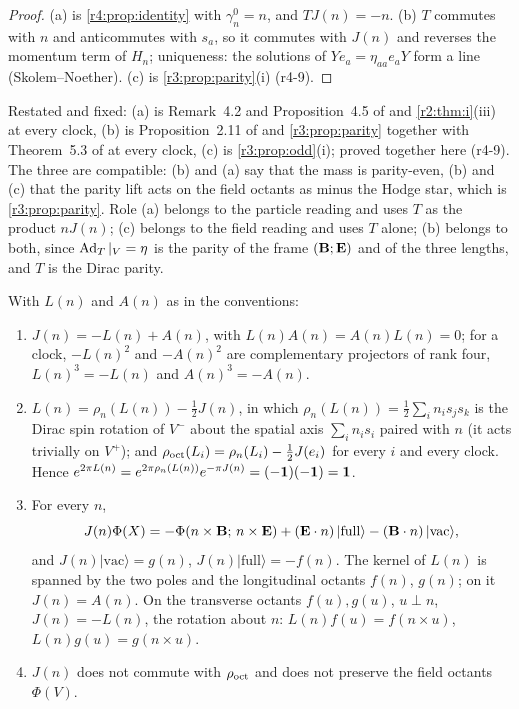 \begin{proof}
(a) is \cref{r4:prop:identity} with $\gamma^0_n=n$, and $TJ(n)=-n$. (b) $T$ commutes with $n$ and anticommutes with $s_a$, so it commutes with $J(n)$ and
reverses the momentum term of $H_n$; uniqueness: the solutions of $Ye_a=\eta_{aa}e_aY$ form a line (Skolem--Noether). (c) is
\cref{r3:prop:parity}(i) (r4-9).
\end{proof}

Restated and fixed: (a) is Remark~4.2 and Proposition~4.5 of \cite{ES17} and \cref{r2:thm:i}(iii) at every clock, (b) is Proposition~2.11 of \cite{RE} and
\cref{r3:prop:parity} together with Theorem~5.3 of \cite{ES17} at every clock, (c) is \cref{r3:prop:odd}(i); proved together here (r4-9). The three are
compatible: (b) and (a) say that the mass is parity-even, (b) and (c) that the parity lift acts on the field octants as minus the Hodge star, which is
\cref{r3:prop:parity}. Role (a) belongs to the particle reading and uses $T$ as the product $nJ(n)$; (c) belongs to the field reading and uses $T$
alone; (b) belongs to both, since $\operatorname{Ad}_T|_V=\eta$ is the parity of the frame $(\mathbf B;\mathbf E)$ and of the three lengths, and $T$ is the Dirac parity.

\begin{proposition}
\label{r4:prop:Jdec}
With $L(n)$ and $A(n)$ as in the conventions:
\begin{enumerate}[label=(\roman*),leftmargin=2.2em]
\item $J(n)=-L(n)+A(n)$, with $L(n)A(n)=A(n)L(n)=0$; for a clock, $-L(n)^2$ and $-A(n)^2$ are complementary projectors of rank four, $L(n)^3=-L(n)$ and
$A(n)^3=-A(n)$.
\item $L(n)=\rho_n(L(n))-\tfrac12J(n)$, in which $\rho_n(L(n))=\tfrac12\sum_in_is_js_k$ is the Dirac spin rotation of $V^-$ about the spatial axis
$\sum_in_is_i$ paired with $n$ (it acts trivially on $V^+$); and $\rho_{\rm oct}(L_i)=\rho_n(L_i)-\tfrac12J(e_i)$ for
every $i$ and every clock. Hence $e^{2\pi L(n)}=e^{2\pi\rho_n(L(n))}e^{-\pi J(n)}=(-\mathbf 1)(-\mathbf 1)=\mathbf 1$.
\item For every $n$,
\[
J(n)\Phi(X)=-\Phi(n\times\mathbf B;\,n\times\mathbf E)+(\mathbf E\cdot n)\,|\mathrm{full}\rangle-(\mathbf B\cdot n)\,|\mathrm{vac}\rangle ,
\]
and $J(n)|\mathrm{vac}\rangle=g(n)$, $J(n)|\mathrm{full}\rangle=-f(n)$. The kernel of $L(n)$ is spanned by the two poles and the longitudinal octants $f(n)$, $g(n)$;
on it $J(n)=A(n)$. On the transverse octants $f(u),g(u)$, $u\perp n$, $J(n)=-L(n)$, the rotation about $n$: $L(n)f(u)=f(n\times u)$, $L(n)g(u)=g(n\times u)$.
\item $J(n)$ does not commute with $\rho_{\rm oct}$ and does not preserve the field octants $\Phi(V)$.
\end{enumerate}
\end{proposition}

